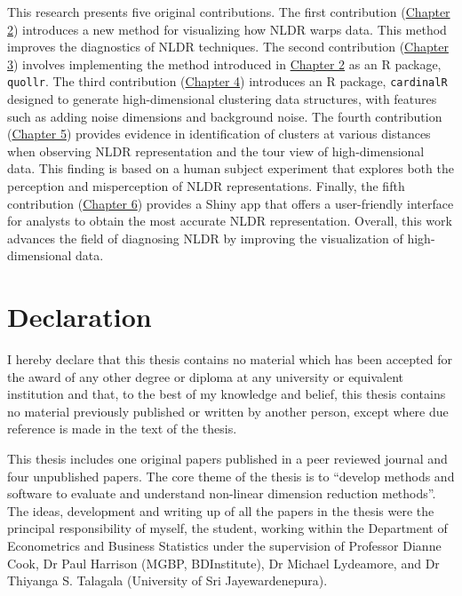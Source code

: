 \documentclass[
  11pt,
  a4paper,
]{report}
\begin{document}
This research presents five original contributions. The first
contribution (\hyperref[sec-first-paper]{Chapter 2}) introduces a new
method for visualizing how NLDR warps data. This method improves the
diagnostics of NLDR techniques. The second contribution
(\hyperref[sec-third-paper]{Chapter 3}) involves implementing the method
introduced in \hyperref[sec-first-paper]{Chapter 2} as an R package,
\texttt{quollr}. The third contribution
(\hyperref[sec-fourth-paper]{Chapter 4}) introduces an R package,
\texttt{cardinalR} designed to generate high-dimensional clustering data
structures, with features such as adding noise dimensions and background
noise. The fourth contribution (\hyperref[sec-second-paper]{Chapter 5})
provides evidence in identification of clusters at various distances
when observing NLDR representation and the tour view of high-dimensional
data. This finding is based on a human subject experiment that explores
both the perception and misperception of NLDR representations. Finally,
the fifth contribution (\hyperref[sec-fifth-paper]{Chapter 6}) provides
a Shiny app that offers a user-friendly interface for analysts to obtain
the most accurate NLDR representation. Overall, this work advances the
field of diagnosing NLDR by improving the visualization of
high-dimensional data.


\chapter*{Declaration}\label{declaration}


I hereby declare that this thesis contains no material which has been
accepted for the award of any other degree or diploma at any university
or equivalent institution and that, to the best of my knowledge and
belief, this thesis contains no material previously published or written
by another person, except where due reference is made in the text of the
thesis.

This thesis includes one original papers published in a peer reviewed
journal and four unpublished papers. The core theme of the thesis is to
``develop methods and software to evaluate and understand non-linear
dimension reduction methods''. The ideas, development and writing up of
all the papers in the thesis were the principal responsibility of
myself, the student, working within the Department of Econometrics and
Business Statistics under the supervision of Professor Dianne Cook, Dr
Paul Harrison (MGBP, BDInstitute), Dr Michael Lydeamore, and Dr Thiyanga
S. Talagala (University of Sri Jayewardenepura).
\end{document}
